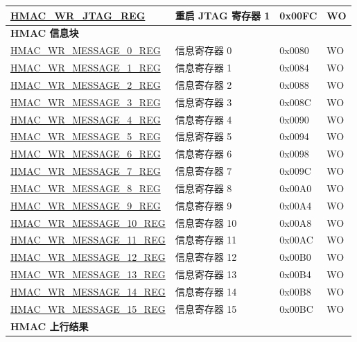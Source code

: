 \begin{longtable}{ | p{6cm} | p{7.2cm} | p{1.3cm} | p{1cm} | }
\hyperref[regdesc:HMACWRJTAGREG]{HMAC\_WR\_JTAG\_REG} & 重启 JTAG 寄存器 1 & 0x00FC & WO \\ \hline
\multicolumn{4}{|l|}{\textbf{HMAC 信息块}} \\ \hline
\hyperref[regdesc:HMACWRMESSAGENREG]{HMAC\_WR\_MESSAGE\_0\_REG} & 信息寄存器 0 & 0x0080 & WO \\ \hline
\hyperref[regdesc:HMACWRMESSAGENREG]{HMAC\_WR\_MESSAGE\_1\_REG} & 信息寄存器 1 & 0x0084 & WO \\ \hline
\hyperref[regdesc:HMACWRMESSAGENREG]{HMAC\_WR\_MESSAGE\_2\_REG} & 信息寄存器 2 & 0x0088 & WO \\ \hline
\hyperref[regdesc:HMACWRMESSAGENREG]{HMAC\_WR\_MESSAGE\_3\_REG} & 信息寄存器 3 & 0x008C & WO \\ \hline
\hyperref[regdesc:HMACWRMESSAGENREG]{HMAC\_WR\_MESSAGE\_4\_REG} & 信息寄存器 4 & 0x0090 & WO \\ \hline
\hyperref[regdesc:HMACWRMESSAGENREG]{HMAC\_WR\_MESSAGE\_5\_REG} & 信息寄存器 5 & 0x0094 & WO \\ \hline
\hyperref[regdesc:HMACWRMESSAGENREG]{HMAC\_WR\_MESSAGE\_6\_REG} & 信息寄存器 6 & 0x0098 & WO \\ \hline
\hyperref[regdesc:HMACWRMESSAGENREG]{HMAC\_WR\_MESSAGE\_7\_REG} & 信息寄存器 7 & 0x009C & WO \\ \hline
\hyperref[regdesc:HMACWRMESSAGENREG]{HMAC\_WR\_MESSAGE\_8\_REG} & 信息寄存器 8 & 0x00A0 & WO \\ \hline
\hyperref[regdesc:HMACWRMESSAGENREG]{HMAC\_WR\_MESSAGE\_9\_REG} & 信息寄存器 9 & 0x00A4 & WO \\ \hline
\hyperref[regdesc:HMACWRMESSAGENREG]{HMAC\_WR\_MESSAGE\_10\_REG} & 信息寄存器 10 & 0x00A8 & WO \\ \hline
\hyperref[regdesc:HMACWRMESSAGENREG]{HMAC\_WR\_MESSAGE\_11\_REG} & 信息寄存器 11 & 0x00AC & WO \\ \hline
\hyperref[regdesc:HMACWRMESSAGENREG]{HMAC\_WR\_MESSAGE\_12\_REG} & 信息寄存器 12 & 0x00B0 & WO \\ \hline
\hyperref[regdesc:HMACWRMESSAGENREG]{HMAC\_WR\_MESSAGE\_13\_REG} & 信息寄存器 13 & 0x00B4 & WO \\ \hline
\hyperref[regdesc:HMACWRMESSAGENREG]{HMAC\_WR\_MESSAGE\_14\_REG} & 信息寄存器 14 & 0x00B8 & WO \\ \hline
\hyperref[regdesc:HMACWRMESSAGENREG]{HMAC\_WR\_MESSAGE\_15\_REG} & 信息寄存器 15 & 0x00BC & WO \\ \hline
\multicolumn{4}{|l|}{\textbf{HMAC 上行结果}} \\ \hline

\end{longtable}
